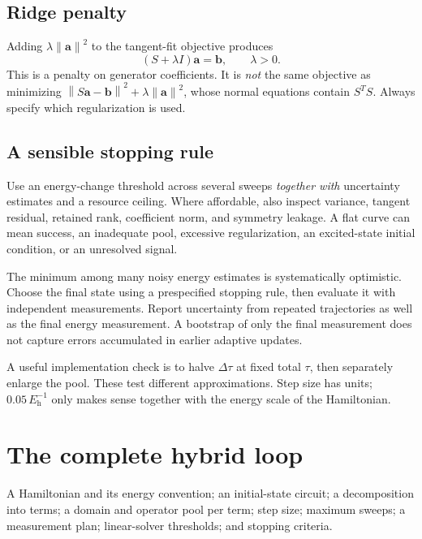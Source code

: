 \documentclass[11pt,a4paper]{article}
\newcommand{\norm}[1]{\left\lVert #1\right\rVert}
\newcommand{\dt}{\Delta\tau}
\newcommand{\Eh}{E_{\mathrm h}}
\newcommand{\lesson}[2]{\clearpage\section{#1}\label{#2}}
\begin{document}
\subsection*{Ridge penalty}
Adding $\lambda\norm{\bm a}^2$ to the tangent-fit objective produces
\[
(S+\lambda I)\bm a=\bm b,\qquad\lambda>0.
\]
This is a penalty on generator coefficients. It is \emph{not} the same objective as minimizing $\norm{S\bm a-\bm b}^2+\lambda\norm{\bm a}^2$, whose normal equations contain $S^TS$. Always specify which regularization is used.

\subsection*{A sensible stopping rule}
Use an energy-change threshold across several sweeps \emph{together with} uncertainty estimates and a resource ceiling. Where affordable, also inspect variance, tangent residual, retained rank, coefficient norm, and symmetry leakage. A flat curve can mean success, an inadequate pool, excessive regularization, an excited-state initial condition, or an unresolved signal.

\begin{caution}
The minimum among many noisy energy estimates is systematically optimistic. Choose the final state using a prespecified stopping rule, then evaluate it with independent measurements. Report uncertainty from repeated trajectories as well as the final energy measurement. A bootstrap of only the final measurement does not capture errors accumulated in earlier adaptive updates.
\end{caution}

A useful implementation check is to halve $\dt$ at fixed total $\tau$, then separately enlarge the pool. These test different approximations. Step size has units; $0.05\,\Eh^{-1}$ only makes sense together with the energy scale of the Hamiltonian.

\lesson{The complete hybrid loop}{sec:algorithm}
\begin{idea}[Inputs]
A Hamiltonian and its energy convention; an initial-state circuit; a decomposition into terms; a domain and operator pool per term; step size; maximum sweeps; a measurement plan; linear-solver thresholds; and stopping criteria.
\end{idea}
\end{document}
